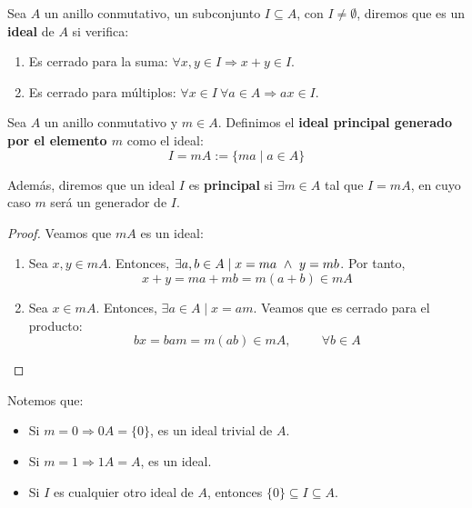 \begin{definicion}[Ideal]
    Sea $A$ un anillo conmutativo, un subconjunto $I \subseteq A$, con $I \neq \emptyset$, diremos que es un \textbf{ideal} de $A$ si verifica:
    \begin{enumerate}
        \item Es cerrado para la suma: $\forall x,y \in I \Longrightarrow x+y \in I$.
        \item Es cerrado para múltiplos: $\forall x \in I ~\forall a \in A \Longrightarrow ax \in I$.
    \end{enumerate}
\end{definicion}

\begin{teo}
    Sea $A$ un anillo conmutativo y $m \in A$. Definimos el \textbf{ideal principal generado por el elemento $m$} como el ideal:
    $$I = mA := \{ma \mid a \in A\}$$

    Además, diremos que un ideal $I$ es \textbf{principal} si $\exists m \in A$ tal que $I = mA$, en cuyo caso $m$ será un generador de $I$.
\end{teo}
\begin{proof}
    Veamos que $mA$ es un ideal:
    \begin{enumerate}
        \item Sea $x,y\in mA$. Entonces, $\exists a,b \in A \mid x=ma \ \land \  y=mb$. Por tanto,
        \begin{equation*}
            x+y = ma+mb = m(a+b) \in mA
        \end{equation*}

        \item Sea $x\in mA$. Entonces, $\exists a\in A\mid x=am$. Veamos que es cerrado para el producto:
        \begin{equation*}
            bx = bam = m(ab)\in mA, \hspace{1cm} \forall b\in A
        \end{equation*}
    \end{enumerate}
\end{proof}

Notemos que:
\begin{itemize}
    \item Si $m=0 \Longrightarrow 0A = \{0\}$, es un ideal trivial de $A$.
    \item Si $m=1 \Longrightarrow 1A = A$, es un ideal.
    \item Si $I$ es cualquier otro ideal de $A$, entonces $\{0\} \subseteq I \subseteq A$.
\end{itemize}

